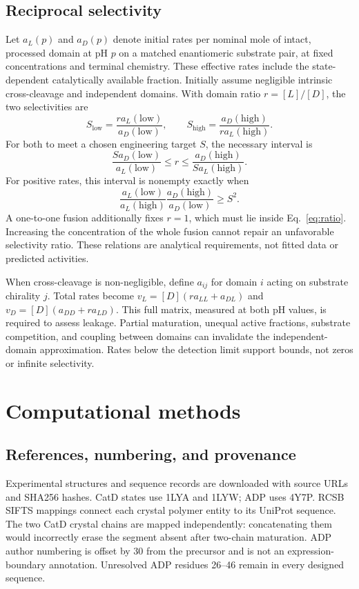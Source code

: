 \documentclass{article}
\begin{document}
\subsection{Reciprocal selectivity}
Let $a_L(p)$ and $a_D(p)$ denote initial rates per nominal mole of intact,
processed domain at pH $p$ on a matched enantiomeric substrate pair, at fixed
concentrations and terminal chemistry. These effective rates include the
state-dependent catalytically available fraction. Initially assume negligible intrinsic cross-cleavage and
independent domains. With domain ratio $r=[L]/[D]$, the two selectivities are
\begin{equation}
S_{\mathrm{low}}=\frac{r a_L(\mathrm{low})}{a_D(\mathrm{low})},\qquad
S_{\mathrm{high}}=\frac{a_D(\mathrm{high})}{r a_L(\mathrm{high})}.
\end{equation}
For both to meet a chosen engineering target $S$, the necessary interval is
\begin{equation}
\frac{S a_D(\mathrm{low})}{a_L(\mathrm{low})}\leq r\leq
\frac{a_D(\mathrm{high})}{S a_L(\mathrm{high})}.
\label{eq:ratio}
\end{equation}
For positive rates, this interval is nonempty exactly when
\begin{equation}
\frac{a_L(\mathrm{low})}{a_L(\mathrm{high})}
\frac{a_D(\mathrm{high})}{a_D(\mathrm{low})}\geq S^2.
\label{eq:range}
\end{equation}
A one-to-one fusion additionally fixes $r=1$, which must lie inside
Eq.~\ref{eq:ratio}. Increasing the concentration of the whole fusion cannot
repair an unfavorable selectivity ratio. These relations are analytical
requirements, not fitted data or predicted activities.

When cross-cleavage is non-negligible, define $a_{ij}$ for domain $i$ acting on
substrate chirality $j$. Total rates become
$v_L=[D](r a_{LL}+a_{DL})$ and
$v_D=[D](a_{DD}+r a_{LD})$. This full matrix, measured at both pH values, is
required to assess leakage. Partial maturation, unequal active fractions,
substrate competition, and coupling between domains can invalidate the
independent-domain approximation. Rates below the detection limit support
bounds, not zeros or infinite selectivity.



\section{Computational methods}
\subsection{References, numbering, and provenance}
Experimental structures and sequence records are downloaded with source URLs
and SHA256 hashes. CatD states use 1LYA and 1LYW; ADP uses 4Y7P.
RCSB SIFTS mappings connect each crystal polymer entity to its UniProt sequence.
The two CatD crystal chains are mapped independently: concatenating them would
incorrectly erase the segment absent after two-chain maturation. ADP author
numbering is offset by 30 from the precursor and is not an expression-boundary
annotation. Unresolved ADP residues 26--46 remain in every designed sequence.
\end{document}
